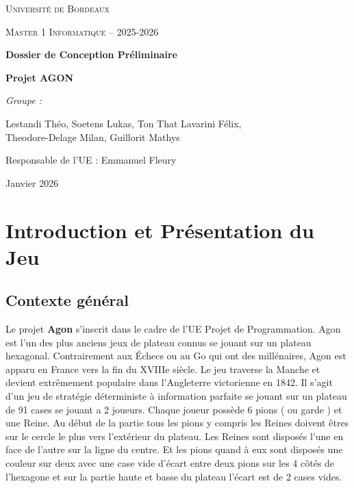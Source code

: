 \documentclass[10pt]{article} %
\begin{document}
\begin{titlepage}
    \centering
    \vspace*{1cm}
    {\scshape\LARGE Université de Bordeaux \par}
    \vspace{1cm}
    {\scshape\Large Master 1 Informatique -- 2025-2026 \par}
    \vspace{2cm}
    {\huge\bfseries Dossier de Conception Préliminaire\par}
    \vspace{0.5cm}
    {\Large\bfseries Projet AGON \par}
    \vspace{2cm}
    {\Large\itshape Groupe :\par}
    Lestandi Théo, Soetens Lukas, Ton That Lavarini Félix, \\
    Theodore-Delage Milan, Guillorit Mathys \par
    \vfill
    {\large Responsable de l'UE : Emmanuel Fleury \par}
    {\large Janvier 2026 \par}
    
\end{titlepage}

\newpage
\tableofcontents
\newpage

\section{Introduction et Présentation du Jeu}
\subsection{Contexte général}
Le projet \textbf{Agon} s'inscrit dans le cadre de l'UE Projet de Programmation. Agon est l'un des plus anciens jeux de plateau connus se jouant sur un plateau hexagonal. Contrairement aux Échecs ou au Go qui ont des millénaires, Agon est apparu en France vers la fin du XVIIIe siècle. Le jeu traverse la Manche et devient extrêmement populaire dans l'Angleterre victorienne en 1842. Il s'agit d'un jeu de stratégie déterministe à information parfaite se jouant sur un plateau de 91 cases se jouant a 2 joueurs. Chaque joueur possède 6 pions ( ou garde ) et une Reine. Au début de la partie tous les pions y compris les Reines doivent êtres sur le cercle le plus vers l'extérieur du plateau. Les Reines sont disposés l’une en face de l’autre sur la ligne du centre. Et les pions quand à eux sont disposés une couleur sur deux avec une case vide d’écart entre deux pions sur les 4 côtés de l'hexagone et sur la partie haute et basse du plateau l’écart est de 2 cases vides. 
\medskip
\end{document}

